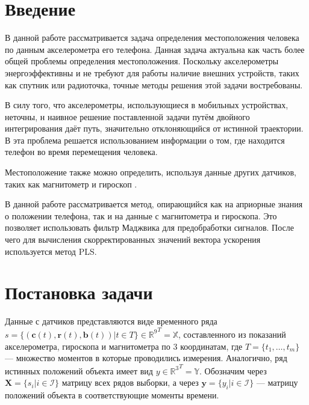 \documentclass[12pt,twoside]{article}
\title
    {Определение местоположения по сигналам акселерометра}
\author
    {Макаров~М.\,В.} %
\begin{document}
\maketitle

\section{Введение}
В данной работе рассматривается задача определения местоположения человека по данным акселерометра его телефона. Данная задача актуальна как часть
более общей проблемы определения местоположения. Поскольку акселерометры энергоэффективны и не требуют для работы наличие внешних устройств, таких как спутник или радиоточка, точные методы решения этой задачи востребованы.
    
В силу того, что акселерометры, использующиеся в мобильных устройствах, неточны, н
наивное решение поставленной задачи путём двойного интегрирования даёт путь, значительно отклоняющийся от истинной траектории.
В \cite{journals/corr/abs-1712-09004} эта проблема решается использованием информации о том, где находится телефон во время 
перемещения человека.

Местоположение также можно определить, используя данные других датчиков, таких как магнитометр \cite{6987239} и гироскоп \cite{s18051391}.

В данной работе рассматривается метод, опирающийся как на априорные знания о положении телефона, так и на данные с магнитометра и гироскопа.
Это позволяет использовать фильтр Маджвика для предобработки сигналов. После чего для вычисления скорректированных значений вектора ускорения
используется метод PLS.

\section{Постановка задачи}
Данные с датчиков представляются виде временного ряда 
$s = \{ (\mathbf{c}(t), \mathbf{r}(t), \mathbf{b}(t)) | t \in T \} \in {\mathbb{R}^{9}}^T = \mathbb{X}$, 
составленного из показаний акселерометра, гироскопа и магнитометра по 3 координатам, 
где 
$T = \{ t_1, \ldots, t_m \}$ --- множество моментов в которые проводились измерения. 
Аналогично, ряд истинных положений объекта имеет вид $y \in {\mathbb{R}^{3}}^T = \mathbb{Y}$.
Обозначим через $\mathbf{X} = \{ s_i | i \in \mathcal{I} \} $ матрицу всех рядов выборки, 
а через $\mathbf{y} = \{ y_i | i \in \mathcal{I} \}$ --- матрицу положений объекта в соответствующие моменты времени.
\end{document}
